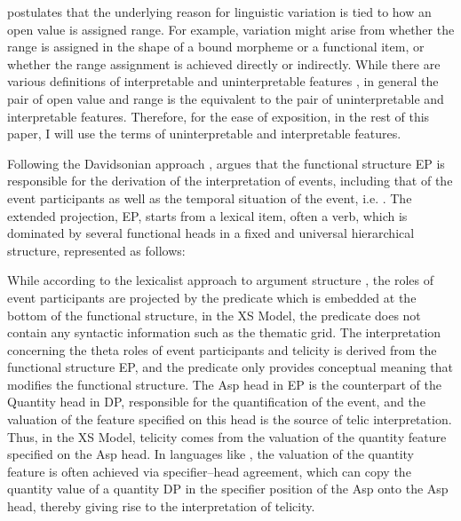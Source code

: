 \documentclass[output=paper]{langsci/langscibook}
\begin{document}
\textcite{Borer2005a,Borer2005b,Borer2013} postulates that the underlying reason
for linguistic variation is tied to how an open value is assigned range. For
example, variation might arise from whether the range is assigned in the shape
of a bound morpheme or a functional item, or whether the range assignment is
achieved directly or indirectly. While there are various definitions of
interpretable and uninterpretable features \citep[cf.][]{PesTor2004}, in
general the pair of open value and range is the equivalent to the pair of
uninterpretable and interpretable features. Therefore, for the ease of
exposition, in the rest of this paper, I will use the terms of uninterpretable
and interpretable features.

Following the Davidsonian approach
\citep{davidson1967logical,davidson1980essays,Parsons1990}, \textcite{Borer2005a}
argues that the functional structure EP is responsible for the derivation of
the interpretation of events, including that of the event participants as well
as the temporal situation of the event, i.e.  . The extended
projection, EP, starts from a lexical item, often a verb, which is dominated by
several functional heads in a fixed and universal hierarchical structure,
represented as follows:

\begin{exe}
\ex
\end{exe}
\begin{center}
\end{center}

While according to the lexicalist approach to argument structure
\citep[cf.][]{Chomsky1970,Reinhart2002}, the roles of event participants are
projected by the predicate which is embedded at the bottom of the functional
structure, in the XS Model, the predicate does not contain any syntactic
information such as the thematic grid. The interpretation concerning the theta
roles of event participants and telicity is derived from the functional
structure EP, and the predicate only provides conceptual meaning that modifies
the functional structure. The Asp head in EP is the counterpart of the
Quantity head in DP, responsible for the quantification of the event, and the
valuation of the feature specified on this head is the source of telic
interpretation. Thus, in the XS Model, telicity comes from the valuation of the
quantity feature specified on the Asp head. In languages like , the
valuation of the quantity feature is often achieved via specifier--head
agreement, which can copy the quantity value of a quantity DP in the specifier
position of the Asp onto the Asp head, thereby giving rise to the
interpretation of telicity.
\end{document}
